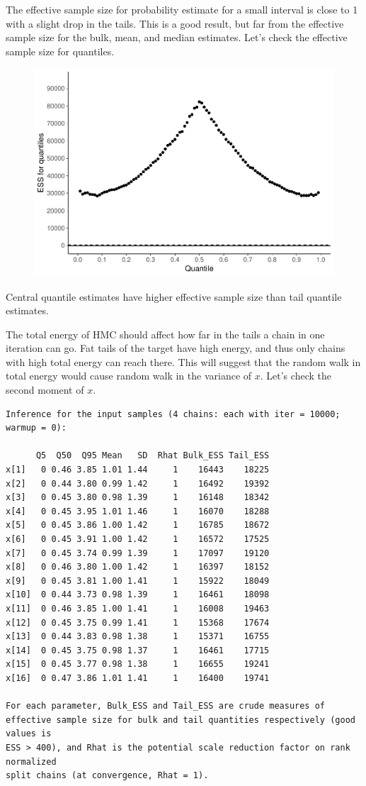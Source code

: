\documentclass[american,]{article}
\begin{document}
The effective sample size for probability estimate for a small interval
is close to 1 with a slight drop in the tails. This is a good result,
but far from the effective sample size for the bulk, mean, and median
estimates. Let's check the effective sample size for quantiles.

\begin{figure}[tp]
  \centering
  \includegraphics[width=0.6\linewidth]{graphics/quantile-ess-fit-n-1.pdf}
\end{figure}

Central quantile estimates have higher effective sample size than tail
quantile estimates.

The total energy of HMC should affect how far in the tails a chain in
one iteration can go. Fat tails of the target have high energy, and thus
only chains with high total energy can reach there. This will suggest
that the random walk in total energy would cause random walk in the
variance of \(x\). Let's check the second moment of \(x\).

\begin{verbatim}
Inference for the input samples (4 chains: each with iter = 10000; warmup = 0):

      Q5  Q50  Q95 Mean   SD  Rhat Bulk_ESS Tail_ESS
x[1]   0 0.46 3.85 1.01 1.44     1    16443    18225
x[2]   0 0.44 3.80 0.99 1.42     1    16492    19392
x[3]   0 0.45 3.80 0.98 1.39     1    16148    18342
x[4]   0 0.45 3.95 1.01 1.46     1    16070    18288
x[5]   0 0.45 3.86 1.00 1.42     1    16785    18672
x[6]   0 0.45 3.91 1.00 1.42     1    16572    17525
x[7]   0 0.45 3.74 0.99 1.39     1    17097    19120
x[8]   0 0.46 3.80 1.00 1.42     1    16397    18152
x[9]   0 0.45 3.81 1.00 1.41     1    15922    18049
x[10]  0 0.44 3.73 0.98 1.39     1    16461    18098
x[11]  0 0.46 3.85 1.00 1.41     1    16008    19463
x[12]  0 0.45 3.75 0.99 1.41     1    15368    17674
x[13]  0 0.44 3.83 0.98 1.38     1    15371    16755
x[14]  0 0.45 3.75 0.98 1.37     1    16461    17715
x[15]  0 0.45 3.77 0.98 1.38     1    16655    19241
x[16]  0 0.47 3.86 1.01 1.41     1    16400    19741

For each parameter, Bulk_ESS and Tail_ESS are crude measures of 
effective sample size for bulk and tail quantities respectively (good values is 
ESS > 400), and Rhat is the potential scale reduction factor on rank normalized
split chains (at convergence, Rhat = 1).
\end{verbatim}
\end{document}
